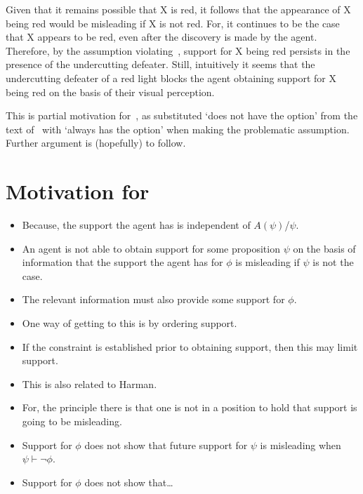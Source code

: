 \begin{note}
  Given that it remains possible that X is red, it follows that the appearance of X being red would be misleading if X is not red.
  For, it continues to be the case that X appears to be red, even after the discovery is made by the agent.
  Therefore, by the assumption violating~\nI{}, support for X being red persists in the presence of the undercutting defeater.
  Still, intuitively it seems that the undercutting defeater of a red light blocks the agent obtaining support for X being red on the basis of their visual perception.

  This is partial motivation for~\nI{}, as substituted `does not have the option' from the text of~\nI{} with `always has the option' when making the problematic assumption.
  Further argument is (hopefully) to follow.
\end{note}


\section{Motivation for \nI{}}
\label{sec:motivation-ni}

\begin{itemize}
\item Because, the support the agent has is independent of \(A(\psi)\)/\(\psi\).
\end{itemize}

\begin{itemize}
\item An agent is not able to obtain support for some proposition \(\psi\) on the basis of information that the support the agent has for \(\phi\) is misleading if \(\psi\) is not the case.
\end{itemize}

\begin{itemize}
\item The relevant information must also provide some support for \(\phi\).
\item One way of getting to this is by ordering support.
\item If the constraint is established prior to obtaining support, then this may limit support.
\end{itemize}

\begin{itemize}
\item This is also related to Harman.
\item For, the principle there is that one is not in a position to hold that support is going to be misleading.
\item Support for \(\phi\) does not show that future support for \(\psi\) is misleading when \(\psi \vdash \lnot\phi\).
\item Support for \(\phi\) does not show that\dots
\end{itemize}

